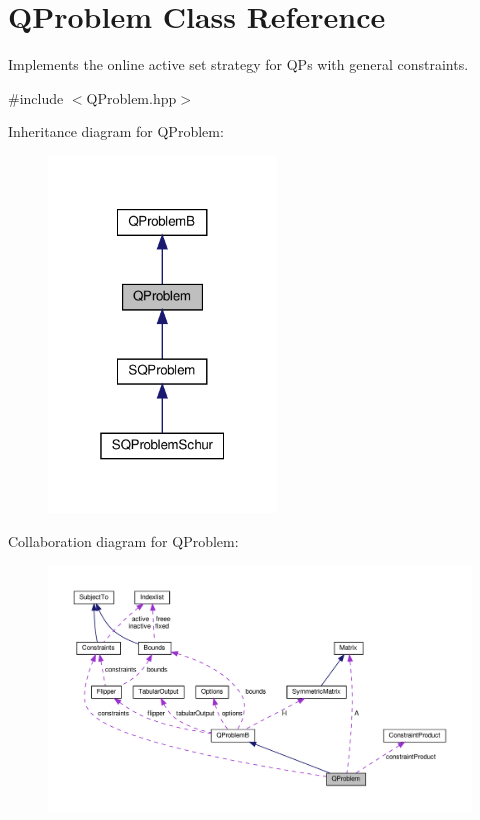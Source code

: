 \hypertarget{class_q_problem}{}\section{Q\+Problem Class Reference}
\label{class_q_problem}


Implements the online active set strategy for Q\+Ps with general constraints.  




{\ttfamily \#include $<$Q\+Problem.\+hpp$>$}



Inheritance diagram for Q\+Problem\+:
\nopagebreak
\begin{figure}[H]
\begin{center}
\leavevmode
\includegraphics[width=172pt]{class_q_problem__inherit__graph}
\end{center}
\end{figure}


Collaboration diagram for Q\+Problem\+:
\nopagebreak
\begin{figure}[H]
\begin{center}
\leavevmode
\includegraphics[width=350pt]{class_q_problem__coll__graph}
\end{center}
\end{figure}
